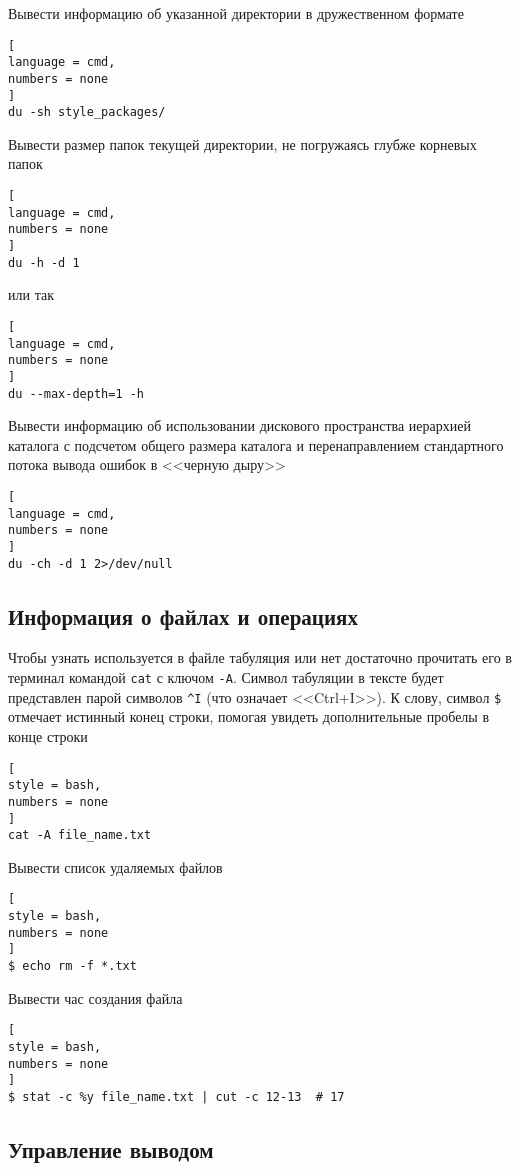 \documentclass[%
	11pt,
	a4paper,
	utf8,
		]{article}
\begin{document}
Вывести информацию об указанной директории в дружественном формате
\begin{lstlisting}[
language = cmd,
numbers = none
]
du -sh style_packages/
\end{lstlisting}

Вывести размер папок текущей директории, не погружаясь глубже корневых папок
\begin{lstlisting}[
language = cmd,
numbers = none
]
du -h -d 1
\end{lstlisting}
или так
\begin{lstlisting}[
language = cmd,
numbers = none
]
du --max-depth=1 -h
\end{lstlisting}

Вывести информацию об использовании дискового пространства иерархией каталога с подсчетом общего размера каталога и перенаправлением стандартного потока вывода ошибок в <<черную дыру>>
\begin{lstlisting}[
language = cmd,
numbers = none
]
du -ch -d 1 2>/dev/null
\end{lstlisting}

\subsection{Информация о файлах и операциях}

Чтобы узнать используется в файле табуляция или нет достаточно прочитать его в терминал командой \texttt{cat} с ключом \verb|-A|. Символ табуляции в тексте будет представлен парой символов \verb|^I| (что означает <<Ctrl+I>>). К слову, символ \verb|$| отмечает истинный конец строки, помогая увидеть дополнительные пробелы в конце строки
\begin{lstlisting}[
style = bash,
numbers = none
]
cat -A file_name.txt
\end{lstlisting}

Вывести список удаляемых файлов
\begin{lstlisting}[
style = bash,
numbers = none
]
$ echo rm -f *.txt
\end{lstlisting}

Вывести час создания файла
\begin{lstlisting}[
style = bash,
numbers = none
]
$ stat -c %y file_name.txt | cut -c 12-13  # 17
\end{lstlisting}

\subsection{Управление выводом}
\end{document}

